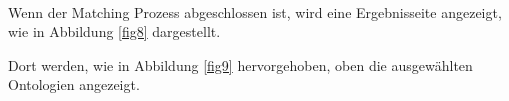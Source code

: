 		\\
		Wenn der Matching Prozess abgeschlossen ist, wird eine Ergebnisseite
		angezeigt, wie in Abbildung \ref{fig8} dargestellt.\\
		\begin{minipage}{\linewidth}
			\label{fig8}  
		\end{minipage}
		
		Dort werden, wie in Abbildung \ref{fig9} hervorgehoben, oben die ausgewählten
		Ontologien angezeigt.\\
		\begin{minipage}{\linewidth}
			\label{fig9}  
		\end{minipage}
		
		\pagebreak[4]
		
